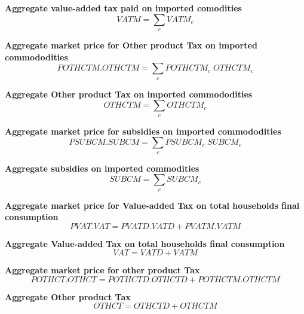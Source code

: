 \documentclass[12pt]{article}
\numberwithin{equation}{section}
\begin{document}
\noindent \textbf{Aggregate value-added tax paid on imported comodities} 
\begin{dmath}
VATM = \sum_{c} VATM_{c}
\label{Exception_taxes_prices.mdlVATM}
\end{dmath}

\noindent \textbf{Aggregate market price for Other product Tax on imported commododities} 
\begin{dmath}
POTHCTM . OTHCTM = \sum_{c} POTHCTM_{c} \; OTHCTM_{c}
\label{Exception_taxes_prices.mdlPOTHCTM}
\end{dmath}

\noindent \textbf{Aggregate Other product Tax on imported commododities} 
\begin{dmath}
OTHCTM = \sum_{c} OTHCTM_{c}
\label{Exception_taxes_prices.mdlOTHCTM}
\end{dmath}

\noindent \textbf{Aggregate market price for subsidies on imported commododities} 
\begin{dmath}
PSUBCM . SUBCM = \sum_{c} PSUBCM_{c} \; SUBCM_{c}
\label{Exception_taxes_prices.mdlPSUBCM}
\end{dmath}

\noindent \textbf{Aggregate subsidies on imported commodities} 
\begin{dmath}
SUBCM = \sum_{c} SUBCM_{c}
\label{Exception_taxes_prices.mdlSUBCM}
\end{dmath}

\noindent \textbf{Aggregate market price for Value-added Tax on total households final consumption} 
\begin{dmath}
PVAT . VAT = PVATD . VATD + PVATM . VATM
\label{Exception_taxes_prices.mdlPVAT}
\end{dmath}

\noindent \textbf{Aggregate Value-added Tax on total households final consumption} 
\begin{dmath}
VAT = VATD + VATM
\label{Exception_taxes_prices.mdlVAT}
\end{dmath}

\noindent \textbf{Aggregate market price for other product Tax} 
\begin{dmath}
POTHCT . OTHCT = POTHCTD . OTHCTD + POTHCTM . OTHCTM
\label{Exception_taxes_prices.mdlPOTHCT}
\end{dmath}

\noindent \textbf{Aggregate Other product Tax} 
\begin{dmath}
OTHCT = OTHCTD + OTHCTM
\label{Exception_taxes_prices.mdlOTHCT}
\end{dmath}
\end{document}
